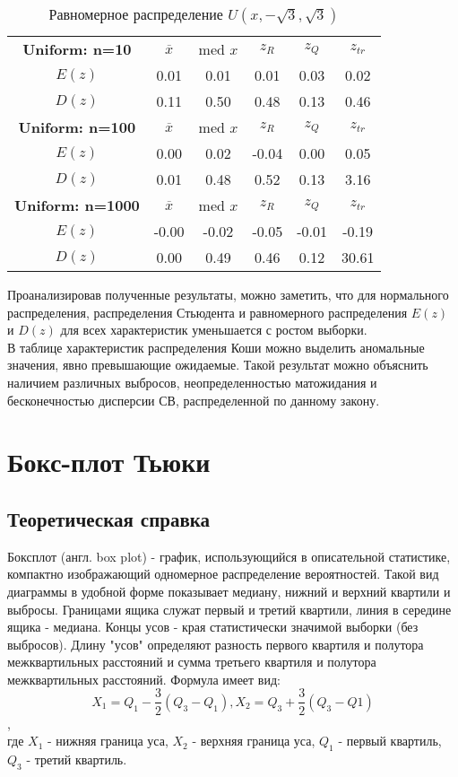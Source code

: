 \documentclass[14pt]{extarticle}
\begin{document}
\begin{table}[htbp]
    \centering
    \begin{tabular}{|c|c|c|c|c|c|}
        \toprule
        \textbf{Uniform: n=10} & \(\overline{x}\) & med \(x\) & \(z_R\) & \(z_Q\) & \(z_{tr}\)\\
        \(E(z)\) & 0.01 & 0.01 & 0.01 & 0.03 & 0.02   \\
        \(D(z)\) & 0.11 & 0.50 & 0.48 & 0.13 & 0.46 \\
        \midrule
  	\textbf{Uniform: n=100} & \(\overline{x}\) & med \(x\) & \(z_R\) & \(z_Q\) & \(z_{tr}\)\\
        \(E(z)\) & 0.00 & 0.02 & -0.04 & 0.00 & 0.05 \\
        \(D(z)\) & 0.01 & 0.48 & 0.52 & 0.13 & 3.16 \\
        \midrule
	\textbf{Uniform: n=1000} & \(\overline{x}\)& med \(x\) & \(z_R\) & \(z_Q\) & \(z_{tr}\)\\
        \(E(z)\) & -0.00 & -0.02 & -0.05 & -0.01 & -0.19  \\
        \(D(z)\) & 0.00 & 0.49 & 0.46 & 0.12 & 30.61 \\
        \toprule
    \end{tabular}
    \caption{Равномерное распределение \(U(x, -\sqrt{3}, \sqrt{3})\)}
    \label{tab:uniform_t}
\end{table}

Проанализировав полученные результаты, можно заметить, что для нормального распределения, распределения Стьюдента и равномерного распределения \(E(z)\) и \(D(z)\) для всех характеристик уменьшается с ростом выборки.\\
В таблице характеристик распределения Коши можно выделить аномальные значения, явно превышающие ожидаемые. Такой результат можно объяснить наличием различных выбросов, неопределенностью матожидания и бесконечностью дисперсии СВ, распределенной по данному закону.

\section{Бокс-плот Тьюки}

\subsection{Теоретическая справка}

Боксплот (англ. box plot) - график, использующийся в описательной статистике, компактно изображающий одномерное распределение вероятностей. Такой вид диаграммы в удобной форме показывает медиану, нижний и верхний квартили и выбросы. Границами ящика служат первый и третий квартили, линия в середине ящика - медиана. Концы усов - края статистически значимой выборки (без выбросов). Длину "усов" определяют разность первого квартиля и полутора межквартильных расстояний и сумма третьего квартиля и полутора межквартильных расстояний. Формула имеет вид:
\[X_1 = Q_1-\frac{3}{2}(Q_3-Q_1), X_2=Q_3+\frac{3}{2}(Q_3-Q1)\], \\
где \(X_1\) - нижняя граница уса, \(X_2\) - верхняя граница уса, \(Q_1\) - первый квартиль, \(Q_3\) - третий квартиль.
\end{document}
